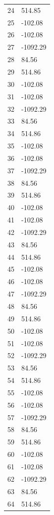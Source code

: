 \documentclass[a4paper,11pt]{article}
\begin{document}
\begin{center}
\begin{longtable}{|R{1.5cm}|R{2.5cm}|}
   24 &       514.85 \\
   25 &      -102.08 \\
   26 &      -102.08 \\
   27 &     -1092.29 \\
   28 &        84.56 \\
   29 &       514.86 \\
   30 &      -102.08 \\
   31 &      -102.08 \\
   32 &     -1092.29 \\
   33 &        84.56 \\
   34 &       514.86 \\
   35 &      -102.08 \\
   36 &      -102.08 \\
   37 &     -1092.29 \\
   38 &        84.56 \\
   39 &       514.86 \\
   40 &      -102.08 \\
   41 &      -102.08 \\
   42 &     -1092.29 \\
   43 &        84.56 \\
   44 &       514.86 \\
   45 &      -102.08 \\
   46 &      -102.08 \\
   47 &     -1092.29 \\
   48 &        84.56 \\
   49 &       514.86 \\
   50 &      -102.08 \\
   51 &      -102.08 \\
   52 &     -1092.29 \\
   53 &        84.56 \\
   54 &       514.86 \\
   55 &      -102.08 \\
   56 &      -102.08 \\
   57 &     -1092.29 \\
   58 &        84.56 \\
   59 &       514.86 \\
   60 &      -102.08 \\
   61 &      -102.08 \\
   62 &     -1092.29 \\
   63 &        84.56 \\
   64 &       514.86 \\

\end{longtable}
\end{center}
\end{document}
